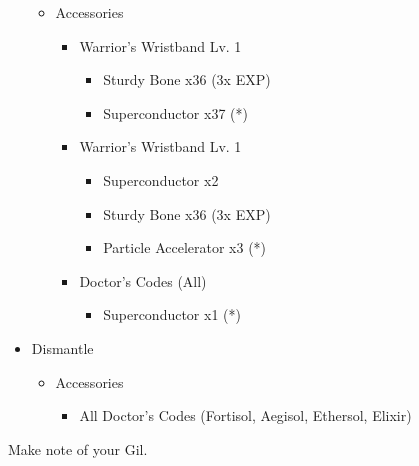 \begin{upgrade}
\begin{itemize}
\begin{itemize}
\begin{itemize}
				            \end{itemize}
				      \item Accessories
				            \begin{itemize}
					            \item Warrior's Wristband Lv. 1
					                  \begin{itemize}
						                  \item Sturdy Bone x36 (3x EXP)
						                  \item Superconductor x37 (*)
					                  \end{itemize}
					            \item Warrior's Wristband Lv. 1
					                  \begin{itemize}
						                  \item Superconductor x2
						                  \item Sturdy Bone x36 (3x EXP)
						                  \item Particle Accelerator x3 (*)
					                  \end{itemize}
					            \item Doctor's Codes (All)
					                  \begin{itemize}
						                  \item Superconductor x1 (*)
					                  \end{itemize}
				            \end{itemize}
			      \end{itemize}
			\item Dismantle
			      \begin{itemize}
				      \item Accessories
				            \begin{itemize}
					            \item All Doctor's Codes (Fortisol, Aegisol, Ethersol, Elixir)
				            \end{itemize}
			      \end{itemize}
		\end{itemize}
	\end{upgrade}
	Make note of your Gil.
	
